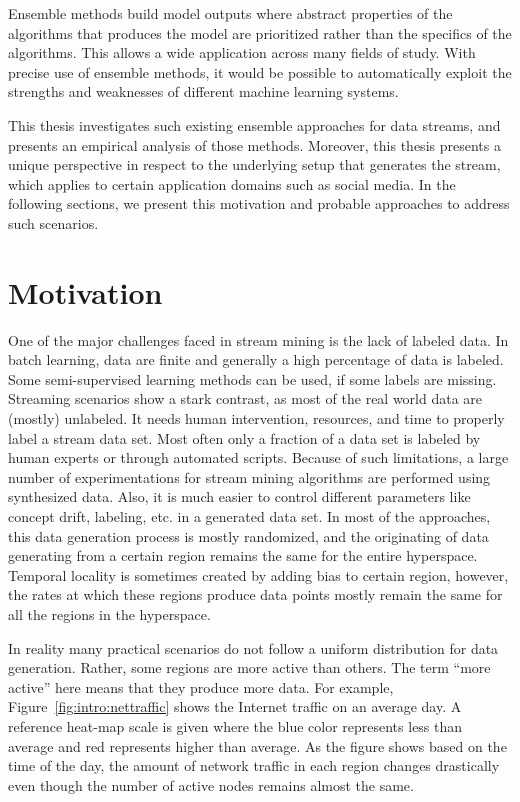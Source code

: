 Ensemble methods build model outputs where abstract properties of the algorithms that produces the model are prioritized rather than the specifics of the algorithms. This allows a wide application across many fields of study. With precise use of ensemble methods, it would be possible to automatically exploit the strengths and weaknesses of different machine learning systems.

This thesis investigates such existing ensemble approaches for data streams, and presents an empirical analysis of those methods. Moreover, this thesis presents a unique perspective in respect to the underlying setup that generates the stream, which applies to certain application domains such as social media. In the following sections, we present this motivation and probable approaches to address such scenarios.

\section{Motivation}
\label{sec:intro:motiv}
One of the major challenges faced in stream mining is the lack of labeled data. In batch learning, data are finite and generally a high percentage of data is labeled. Some semi-supervised learning methods can be used, if some labels are missing. Streaming scenarios show a stark contrast, as most of the real world data are (mostly) unlabeled. It needs human intervention, resources, and time to properly label a stream data set. Most often only a fraction of a data set is labeled by human experts or through automated scripts. Because of such limitations, a large number of experimentations for stream mining algorithms are performed using synthesized data. Also, it is much easier to control different parameters like concept drift, labeling, etc. in a generated data set. In most of the approaches, this data generation process is mostly randomized, and the originating of data generating from a certain region remains the same for the entire hyperspace. Temporal locality is sometimes created by adding bias to certain region, however, the rates at which these regions produce data points mostly remain the same for all the regions in the hyperspace.

In reality many practical scenarios do not follow a uniform distribution for data generation. Rather, some regions are more active than others. The term ``more active'' here means that they produce more data. For example, Figure~\ref{fig:intro:nettraffic} shows the Internet traffic on an average day. A reference heat-map scale is given where the blue color represents less than average and red represents higher than average. As the figure shows based on the time of the day, the amount of network traffic in each region changes drastically even though the number of active nodes remains almost the same.

